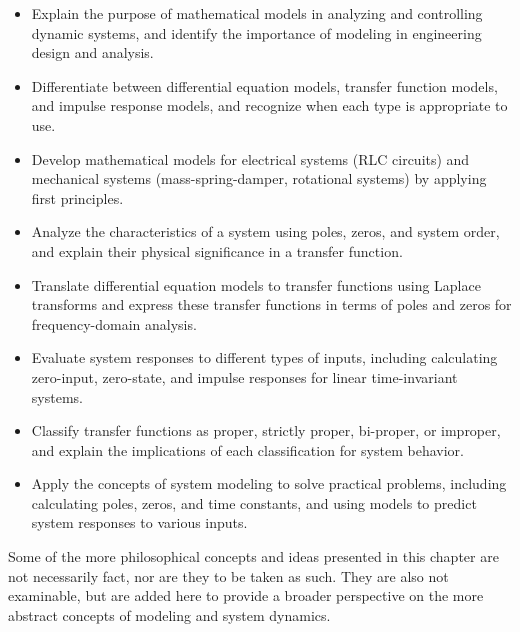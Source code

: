 \documentclass[
  14pt,
  a4paper,
  oneside,
  open=any,
  a4paper,
  14pt]{report}
\begin{document}
\begin{itemize}
\item
  Explain the purpose of mathematical models in analyzing and
  controlling dynamic systems, and identify the importance of modeling
  in engineering design and analysis.
\item
  Differentiate between differential equation models, transfer function
  models, and impulse response models, and recognize when each type is
  appropriate to use.
\item
  Develop mathematical models for electrical systems (RLC circuits) and
  mechanical systems (mass-spring-damper, rotational systems) by
  applying first principles.
\item
  Analyze the characteristics of a system using poles, zeros, and system
  order, and explain their physical significance in a transfer function.
\item
  Translate differential equation models to transfer functions using
  Laplace transforms and express these transfer functions in terms of
  poles and zeros for frequency-domain analysis.
\item
  Evaluate system responses to different types of inputs, including
  calculating zero-input, zero-state, and impulse responses for linear
  time-invariant systems.
\item
  Classify transfer functions as proper, strictly proper, bi-proper, or
  improper, and explain the implications of each classification for
  system behavior.
\item
  Apply the concepts of system modeling to solve practical problems,
  including calculating poles, zeros, and time constants, and using
  models to predict system responses to various inputs.
\end{itemize}

\begin{tcolorbox}[enhanced jigsaw, colframe=quarto-callout-important-color-frame, coltitle=black, colback=white, breakable, titlerule=0mm, rightrule=.15mm, arc=.35mm, bottomtitle=1mm, opacityback=0, toptitle=1mm, title=\textcolor{quarto-callout-important-color}{\faExclamation}\hspace{0.5em}{Philosophy Ahead!}, colbacktitle=quarto-callout-important-color!10!white, bottomrule=.15mm, toprule=.15mm, leftrule=.75mm, left=2mm, opacitybacktitle=0.6]

Some of the more philosophical concepts and ideas presented in this
chapter are not necessarily fact, nor are they to be taken as such. They
are also not examinable, but are added here to provide a broader
perspective on the more abstract concepts of modeling and system
dynamics.

\end{tcolorbox}
\end{document}
